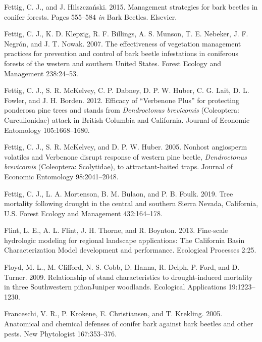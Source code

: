 \documentclass[]{article}
\begin{document}
\leavevmode\hypertarget{ref-fettig2015}{}%
Fettig, C. J., and J. Hilszczański. 2015. Management strategies for bark
beetles in conifer forests. Pages 555--584 \emph{in} Bark Beetles.
Elsevier.

\leavevmode\hypertarget{ref-fettig2007}{}%
Fettig, C. J., K. D. Klepzig, R. F. Billings, A. S. Munson, T. E.
Nebeker, J. F. Negrón, and J. T. Nowak. 2007. The effectiveness of
vegetation management practices for prevention and control of bark
beetle infestations in coniferous forests of the western and southern
United States. Forest Ecology and Management 238:24--53.

\leavevmode\hypertarget{ref-fettig2012c}{}%
Fettig, C. J., S. R. McKelvey, C. P. Dabney, D. P. W. Huber, C. G. Lait,
D. L. Fowler, and J. H. Borden. 2012. Efficacy of ``Verbenone Plus'' for
protecting ponderosa pine trees and stands from \emph{Dendroctonus
brevicomis} (Coleoptera: Curculionidae) attack in British Columbia and
California. Journal of Economic Entomology 105:1668--1680.

\leavevmode\hypertarget{ref-fettig2005}{}%
Fettig, C. J., S. R. McKelvey, and D. P. W. Huber. 2005. Nonhost
angiosperm volatiles and Verbenone disrupt response of western pine
beetle, \emph{Dendroctonus brevicomis} (Coleoptera: Scolytidae), to
attractant-baited traps. Journal of Economic Entomology 98:2041--2048.

\leavevmode\hypertarget{ref-fettig2019}{}%
Fettig, C. J., L. A. Mortenson, B. M. Bulaon, and P. B. Foulk. 2019.
Tree mortality following drought in the central and southern Sierra
Nevada, California, U.S. Forest Ecology and Management 432:164--178.

\leavevmode\hypertarget{ref-flint2013}{}%
Flint, L. E., A. L. Flint, J. H. Thorne, and R. Boynton. 2013.
Fine-scale hydrologic modeling for regional landscape applications: The
California Basin Characterization Model development and performance.
Ecological Processes 2:25.

\leavevmode\hypertarget{ref-floyd2009}{}%
Floyd, M. L., M. Clifford, N. S. Cobb, D. Hanna, R. Delph, P. Ford, and
D. Turner. 2009. Relationship of stand characteristics to
drought-induced mortality in three Southwestern piñonJuniper woodlands.
Ecological Applications 19:1223--1230.

\leavevmode\hypertarget{ref-franceschi2005}{}%
Franceschi, V. R., P. Krokene, E. Christiansen, and T. Krekling. 2005.
Anatomical and chemical defenses of conifer bark against bark beetles
and other pests. New Phytologist 167:353--376.
\end{document}
